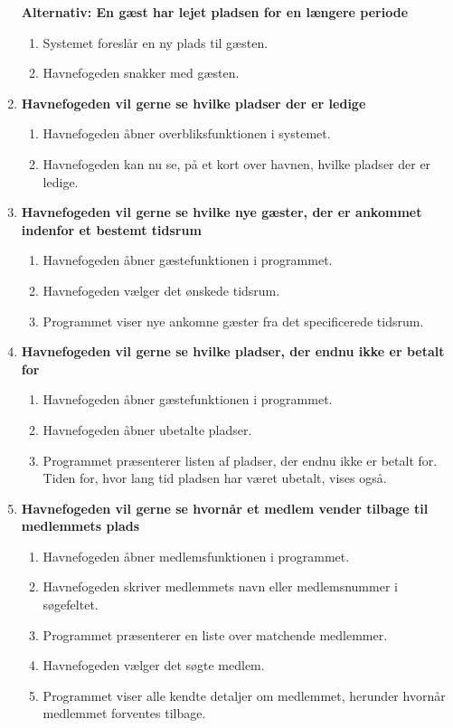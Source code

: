 \begin{enumerate}
    \bf{Alternativ: En gæst har lejet pladsen for en længere periode}
      \begin{enumerate}
        \item Systemet foreslår en ny plads til gæsten.
        \item Havnefogeden snakker med gæsten.
      \end{enumerate}

    \item{\bf{Havnefogeden vil gerne se hvilke pladser der er ledige}}
      \begin{enumerate}
        \item Havnefogeden åbner overbliksfunktionen i systemet.
        \item Havnefogeden kan nu se, på et kort over havnen, hvilke pladser der er ledige.
      \end{enumerate}

    \item{\bf{Havnefogeden vil gerne se hvilke nye gæster, der er ankommet indenfor et bestemt tidsrum}}
      \begin{enumerate}
        \item Havnefogeden åbner gæstefunktionen i programmet.
        \item Havnefogeden vælger det ønskede tidsrum.
        \item Programmet viser nye ankomne gæster fra det specificerede tidsrum.
      \end{enumerate}

    \item{\bf{Havnefogeden vil gerne se hvilke pladser, der endnu ikke er betalt for}}
      \begin{enumerate}
        \item Havnefogeden åbner gæstefunktionen i programmet.
        \item Havnefogeden åbner ubetalte pladser.
        \item Programmet præsenterer listen af pladser, der endnu ikke er betalt for. Tiden for, hvor lang tid pladsen har været ubetalt, vises også.
      \end{enumerate}

    \item{\bf{Havnefogeden vil gerne se hvornår et medlem vender tilbage til medlemmets plads}}
      \begin{enumerate}
        \item Havnefogeden åbner medlemsfunktionen i programmet.
        \item Havnefogeden skriver medlemmets navn eller medlemsnummer i søgefeltet.
        \item Programmet præsenterer en liste over matchende medlemmer.
        \item Havnefogeden vælger det søgte medlem.
        \item Programmet viser alle kendte detaljer om medlemmet, herunder hvornår medlemmet forventes tilbage.
      \end{enumerate}


\end{enumerate}
